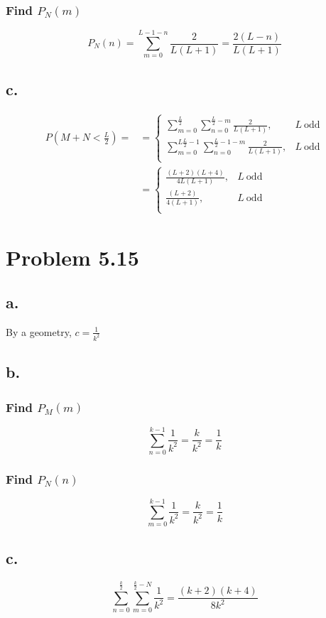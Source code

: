 \documentclass[12pt]{article}
\begin{document}
\subsubsection*{Find $P_N(m)$}
\[P_N(n) = \sum_{m=0}^{L-1-n}\frac{2}{L(L+1)}  = \frac{2(L-n)}{L(L+1)} \]

\subsection*{c.}
\begin{align*}
  P(M+N<\frac{L}{2}) = 
  &= \begin{cases}
    \sum_{m=0}^{\frac{L}{2}} \sum_{n=0}^{\frac{L}{2}-m} \frac{2}{L(L+1)}, & L \ \textrm{odd} \\
    \sum_{m=0}^{L\frac{L}{2}-1} \sum_{n=0}^{\frac{L}{2}-1-m} \frac{2}{L(L+1)}, & L \ \textrm{odd} \\
  \end{cases} \\
  &= \begin{cases}
    \frac{(L+2)(L+4)}{4L(L+1)}, & L \ \textrm{odd} \\
    \frac{(L+2)}{4(L+1)}, & L \ \textrm{odd} \\
  \end{cases}
\end{align*}

\section*{Problem 5.15}
\subsection*{a.}
By a geometry, $c = \frac{1}{k^2}$

\subsection*{b.}
\subsubsection*{Find $P_M(m)$}
\[\sum_{n=0}^{k-1}\frac{1}{k^2} = \frac{k}{k^2} = \frac{1}{k}\]

\subsubsection*{Find $P_N(n)$}
\[\sum_{m=0}^{k-1}\frac{1}{k^2} = \frac{k}{k^2} = \frac{1}{k}\]

\subsection*{c.}
\[\sum_{n=0}^{\frac{k}{2}}\sum_{m=0}^{\frac{k}{2}-N}\frac{1}{k^2} = \frac{(k+2)(k+4)}{8k^2}\]
\end{document}

